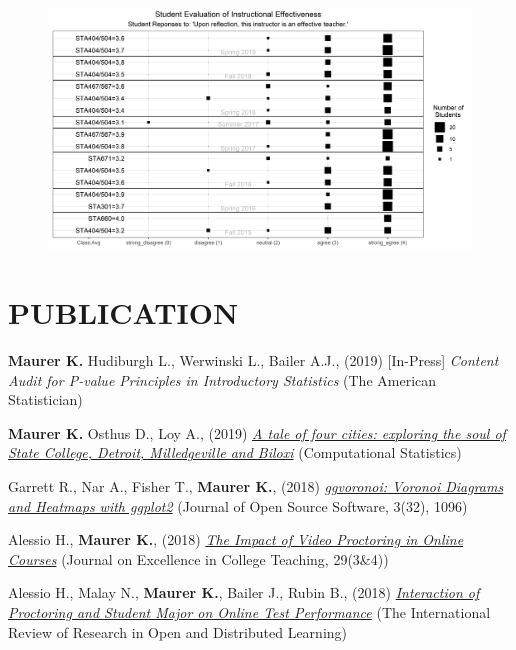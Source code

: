 \documentclass[margin, 10pt]{res}\usepackage[]{graphicx}\usepackage[]{color}
\begin{document}
\begin{resume}
\begin{center}
\begin{figure}[h!]
\hspace{-2cm}\includegraphics[width=1.2\textwidth]{CourseEvalPlotSpring2019.png}
\end{figure}
\end{center}

  
  \section{PUBLICATION} 

\textbf{Maurer K.} Hudiburgh L., Werwinski L., Bailer A.J., (2019) [In-Press] {\it Content Audit for P-value Principles in Introductory Statistics} (The American Statistician)

\textbf{Maurer K.} Osthus D., Loy A., (2019) \href{https://rdcu.be/bgbJV}{\it A tale of four cities: exploring the soul of State College, Detroit, Milledgeville and Biloxi} (Computational Statistics) 

Garrett R., Nar A., Fisher T., \textbf{Maurer K.}, (2018) \href{https://www.theoj.org/joss-papers/joss.01096/10.21105.joss.01096.pdf}{\it ggvoronoi: Voronoi Diagrams and Heatmaps with ggplot2} (Journal of Open Source Software, 3(32), 1096) 

Alessio H., \textbf{Maurer K.}, (2018) \href{http://celt.muohio.edu/ject/fetch.php?id=734}{\it The Impact of Video Proctoring in Online Courses} (Journal on Excellence in College Teaching, 29(3&4)) 

Alessio H., Malay N., \textbf{Maurer K.}, Bailer J., Rubin B., (2018) \href{http://www.irrodl.org/index.php/irrodl/article/view/3698/4843}{\it Interaction of Proctoring and Student Major on Online Test Performance} (The International Review of Research in Open and Distributed Learning) 


\end{resume}
\end{document}
